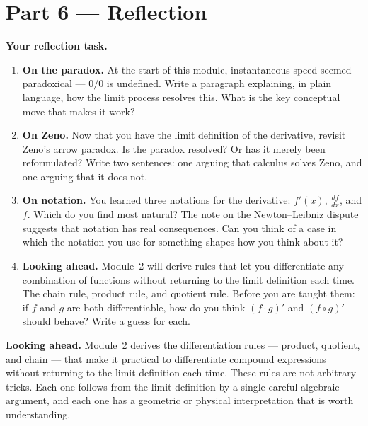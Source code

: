 \documentclass[12pt, a4paper]{article}
\begin{document}
\section{Part 6 \texorpdfstring{---}{--} Reflection}

\begin{reflectionbox}
\textbf{Your reflection task.}

\begin{enumerate}
  \item \textbf{On the paradox.} At the start of this module, instantaneous speed seemed paradoxical --- $0/0$ is undefined. Write a paragraph explaining, in plain language, how the limit process resolves this. What is the key conceptual move that makes it work?

  \item \textbf{On Zeno.} Now that you have the limit definition of the derivative, revisit Zeno's arrow paradox. Is the paradox resolved? Or has it merely been reformulated? Write two sentences: one arguing that calculus solves Zeno, and one arguing that it does not.

  \item \textbf{On notation.} You learned three notations for the derivative: $f'(x)$, $\frac{df}{dx}$, and $\dot{f}$. Which do you find most natural? The note on the Newton--Leibniz dispute suggests that notation has real consequences. Can you think of a case in which the notation you use for something shapes how you think about it?

  \item \textbf{Looking ahead.} Module~2 will derive rules that let you differentiate any combination of functions without returning to the limit definition each time. The chain rule, product rule, and quotient rule. Before you are taught them: if $f$ and $g$ are both differentiable, how do you think $(f \cdot g)'$ and $(f \circ g)'$ should behave? Write a guess for each.
\end{enumerate}
\end{reflectionbox}

\medskip
\noindent\textbf{Looking ahead.}
Module~2 derives the differentiation rules --- product, quotient, and chain --- that make it practical to differentiate compound expressions without returning to the limit definition each time. These rules are not arbitrary tricks. Each one follows from the limit definition by a single careful algebraic argument, and each one has a geometric or physical interpretation that is worth understanding.
\end{document}
